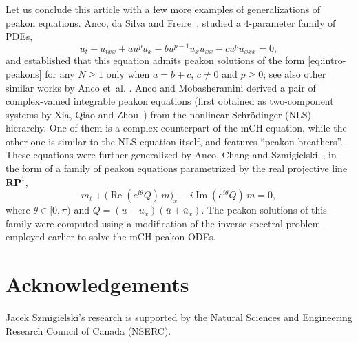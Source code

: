 \documentclass[10pt,a4paper]{article} \pdfoutput=1 
\begin{document}
Let us conclude this article with a few more examples of generalizations of peakon equations.
Anco, da Silva and
Freire~\cite{anco-dasilva-freire:2015:wavebreaking-equations-generalizing-CH-and-novikov},
studied a $4$-parameter family of PDEs,
\begin{equation*}
  u_t - u_{txx} + a u^p u_x - b u^{p-1} u_x u_{xx} - c u^p u_{xxx} = 0
  ,
\end{equation*}
and established that this equation admits peakon solutions of the form \eqref{eq:intro-peakons}
for any $N \ge 1$
only when $a = b + c$, $c \neq 0$ and $p\ge 0$;
see also other similar works by
Anco et~al. \cite{anco-recio-gandarias-bruzon:2015:nonlinear-generalization-of-CH-with-peakons,
  anco-recio:2019:accelerating-dynamical-peakons}.
Anco and Mobasheramini \cite{anco-mobasheramini:2017:integrable-U1-invariant-peakon-equations-NLS}
derived a pair of complex-valued integrable peakon equations
(first obtained as two-component systems by Xia, Qiao and Zhou~\cite{xia-qiao:2015:two-component-CH-with-peakons,xia-qiao-zhou:2015:synthetical-twocomponent-model-peakons})
from the nonlinear Schrödinger (NLS) hierarchy.
One of them is a complex counterpart of the mCH equation,
while the other one is similar to the NLS equation itself, and features ``peakon breathers''.
These equations were further generalized by
Anco, Chang and Szmigielski~\cite{anco-chang-szmigielski:2018:conservative-peakons-U1-invariant-NLS-Hirota},
in the form of a family of peakon equations parametrized by the real projective line~$\mathbf{RP}^1$,
\begin{equation}
  m_t + \bigl( \operatorname{Re} (e^{i\theta} Q) \, m \bigr)_x - i \operatorname{Im} ( e^{i\theta} Q ) \, m = 0
  ,
\end{equation}
where $\theta \in [0, \pi)$ and $Q = (u-u_x)(\bar u + \bar u_x)$.
The peakon solutions of this family were computed
using a modification of the inverse spectral problem employed earlier to solve the mCH peakon ODEs.




\section{Acknowledgements}

Jacek Szmigielski's research is supported by the Natural Sciences and Engineering Research Council of Canada (NSERC).



\end{document}
